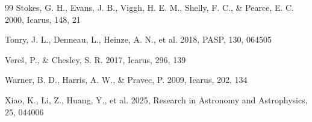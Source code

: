 \documentclass[referee]{raa}
\begin{document}
\begin{thebibliography}{99}
Stokes, G. H., Evans, J. B., Viggh, H. E. M., Shelly, F. C., \& Pearce, E. C. 2000, Icarus, 148, 21

Tonry, J. L., Denneau, L., Heinze, A. N., et al. 2018, PASP, 130, 064505

Vere\v{s}, P., \& Chesley, S. R. 2017, Icarus, 296, 139

Warner, B. D., Harris, A. W., \& Pravec, P. 2009, Icarus, 202, 134

Xiao, K., Li, Z., Huang, Y., et al. 2025, Research in Astronomy and Astrophysics, 25, 044006

\end{thebibliography}
\end{document}
